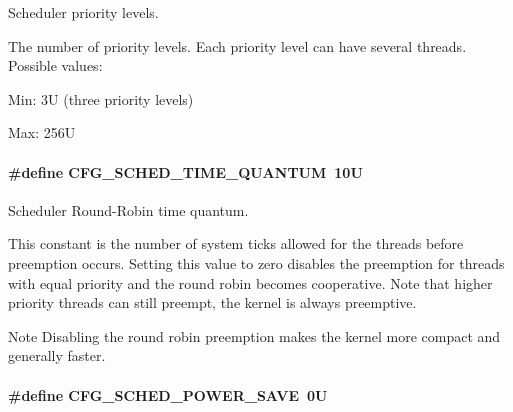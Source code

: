Scheduler priority levels. 

The number of priority levels. Each priority level can have several threads. Possible values\-:
\begin{DoxyItemize}
\item Min\-: 3\-U (three priority levels)
\item Max\-: 256\-U 
\end{DoxyItemize}\hypertarget{group__template__kern__cfg_ga0bd286f16bb67585f14c4d1e45be8ad1}{
\paragraph[{C\-F\-G\-\_\-\-S\-C\-H\-E\-D\-\_\-\-T\-I\-M\-E\-\_\-\-Q\-U\-A\-N\-T\-U\-M}]{\setlength{\rightskip}{0pt plus 5cm}\#define C\-F\-G\-\_\-\-S\-C\-H\-E\-D\-\_\-\-T\-I\-M\-E\-\_\-\-Q\-U\-A\-N\-T\-U\-M~10\-U}}\label{group__template__kern__cfg_ga0bd286f16bb67585f14c4d1e45be8ad1}


Scheduler Round-\/\-Robin time quantum. 

This constant is the number of system ticks allowed for the threads before preemption occurs. Setting this value to zero disables the preemption for threads with equal priority and the round robin becomes cooperative. Note that higher priority threads can still preempt, the kernel is always preemptive. \begin{DoxyNote}{Note}
Disabling the round robin preemption makes the kernel more compact and generally faster. 
\end{DoxyNote}
\hypertarget{group__template__kern__cfg_ga4e6ab4994b34501bb71e75717b093376}{
\paragraph[{C\-F\-G\-\_\-\-S\-C\-H\-E\-D\-\_\-\-P\-O\-W\-E\-R\-\_\-\-S\-A\-V\-E}]{\setlength{\rightskip}{0pt plus 5cm}\#define C\-F\-G\-\_\-\-S\-C\-H\-E\-D\-\_\-\-P\-O\-W\-E\-R\-\_\-\-S\-A\-V\-E~0\-U}}\label{group__template__kern__cfg_ga4e6ab4994b34501bb71e75717b093376}


